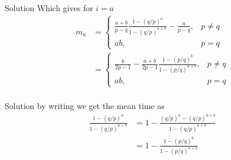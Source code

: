 \documentclass{beamer}
\begin{document}
  \begin{frame}{Solution}
      Which gives for $i=a$
      \begin{align*}
          m_a &=
          \begin{cases}
              \frac{a+b}{p-q} \frac{1-(q/p)^{a}}{1-(q/p)^{a+b}} - \frac{a}{p-q}, & p \neq q \\
              ab, & p=q
          \end{cases} \\
          &= 
          \begin{cases}
                \frac{b}{2p-1} - \frac{a+b}{2p-1}\frac{1-(p/q)^{b}}{1-(p/q)^{a+b}}, & p \neq q \\
                ab, & p=q
          \end{cases} \\
      \end{align*}
  \end{frame}
  
  \begin{frame}{Solution}
      by writing we get the mean time as
      \begin{align*}
          \frac{1-(q/p)^a}{1 - (q/p)^{a+b}} &= 1 - \frac{(q/p)^{a} - (q/p)^{a+b}}{1 - (q/p)^{a+b}} \\
          &= 1 - \frac{1-(p/q)^b}{1 - (p/q)^{a+b}}
      \end{align*}
  \end{frame}
  
\end{document}
